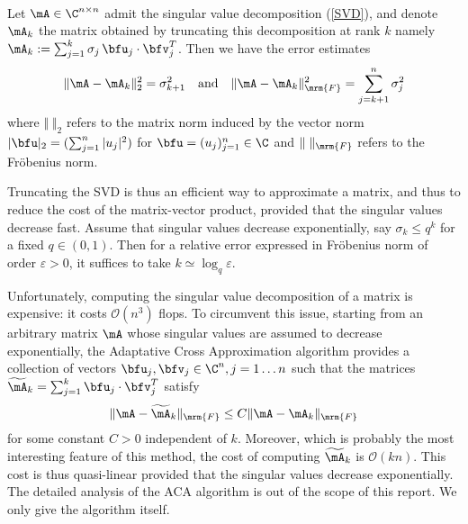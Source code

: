 \begin{proposition}\quad\\
Let $\mA\in \C^{n\times n}$ admit the singular value decomposition (\ref{SVD}), and denote $\mA_{k}$ the 
matrix obtained by truncating this decomposition at rank $k$ namely $\mA_{k}:=\sum_{j=1}^{k}\sigma_{j}\,\bfu_{j}
\cdot\bfv_{j}^{T}$. Then we have the error estimates
$$
\Vert \mA - \mA_{k}\Vert_{2}^{2} = \sigma_{k+1}^{2}
\quad\textrm{and}\quad 
\Vert \mA - \mA_{k}\Vert_{\mrm{F}}^{2} = \sum_{j=k+1}^{n}\sigma_{j}^{2}
$$
where $\Vert \;\Vert_{2}$ refers to the matrix norm induced by the vector norm $\vert \bfu\vert_{2} = (\sum_{j=1}^{n}\vert u_{j}\vert^{2})$ 
for $\bfu = (u_{j})_{j=1}^{n}\in \C$ and $\Vert \;\Vert_{\mrm{F}}$ refers to the Fr\"obenius norm.
\end{proposition}

Truncating the SVD is thus an efficient way to approximate a matrix, and thus to reduce the cost of the 
matrix-vector product, provided that  the singular values decrease fast. Assume that singular values decrease 
exponentially, say $\sigma_{k}\leq q^{k}$ for a fixed $q\in (0,1)$. Then for a relative error expressed in Fr\"obenius norm of order $\varepsilon>0$,  
it suffices to take $k \simeq \log_q \varepsilon$. 

\bigskip
Unfortunately, computing the singular value decomposition  of a matrix is expensive: it costs $\mathcal{O}(n^{3})$ flops. To circumvent this issue, starting from 
an arbitrary matrix $\mA$ whose singular values are assumed to decrease exponentially, the Adaptative 
Cross Approximation algorithm provides a collection of vectors $\bfu_{j},\bfv_{j}\in \C^{n}, j=1\dots n$ such that 
the matrices $\widetilde{\mA}_{k} = \sum_{j=1}^{k}\bfu_{j}\cdot\bfv_{j}^{T}$ satisfy 
$$
\Vert \mA - \widetilde{\mA}_{k}\Vert_{\mrm{F}}\leq C \Vert \mA - \mA_{k}\Vert_{\mrm{F}}
$$
for some constant $C>0$ independent of $k$. Moreover, which is probably the most interesting feature of this method, 
the cost of computing $\widetilde{\mA}_{k}$ is $\mathcal{O}(kn)$. This cost is thus quasi-linear provided that the singular 
values  decrease exponentially. The detailed analysis of the ACA algorithm is out of the scope of this report. We only 
give the algorithm itself.

